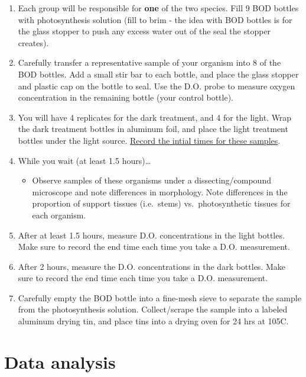 \documentclass[]{krantz}
\providecommand{\tightlist}{%
  \setlength{\itemsep}{0pt}\setlength{\parskip}{0pt}}
\theoremstyle{definition}
\theoremstyle{definition}
\theoremstyle{definition}
\theoremstyle{remark}
\begin{document}
\begin{enumerate}
\def\labelenumi{\arabic{enumi}.}
\tightlist
\item
  Each group will be responsible for \textbf{one} of the two species.
  Fill 9 BOD bottles with photosynthesis solution (fill to brim - the
  idea with BOD bottles is for the glass stopper to push any excess
  water out of the seal the stopper creates).
\item
  Carefully transfer a representative sample of your organism into 8 of
  the BOD bottles. Add a small stir bar to each bottle, and place the
  glass stopper and plastic cap on the bottle to seal. Use the D.O.
  probe to measure oxygen concentration in the remaining bottle (your
  control bottle).
\item
  You will have 4 replicates for the dark treatment, and 4 for the
  light. Wrap the dark treatment bottles in aluminum foil, and place the
  light treatment bottles under the light source.
  \underline{Record the intial times for these samples}.
\item
  While you wait (at least 1.5 hours)\ldots{}

  \begin{itemize}
  \tightlist
  \item
    Observe samples of these organisms under a dissecting/compound
    microscope and note differences in morphology. Note differences in
    the proportion of support tissues (i.e.~stems) vs.~photosynthetic
    tissues for each organism.
  \end{itemize}
\item
  After at least 1.5 hours, measure D.O. concentrations in the light
  bottles. Make sure to record the end time each time you take a D.O.
  measurement.
\item
  After 2 hours, measure the D.O. concentrations in the dark bottles.
  Make sure to record the end time each time you take a D.O.
  measurement.
\item
  Carefully empty the BOD bottle into a fine-mesh sieve to separate the
  sample from the photosynthesis solution. Collect/scrape the sample
  into a labeled aluminum drying tin, and place tins into a drying oven
  for 24 hrs at 105\textdegree{}C.
\end{enumerate}

\section{Data analysis}\label{data-analysis-1}
\end{document}
